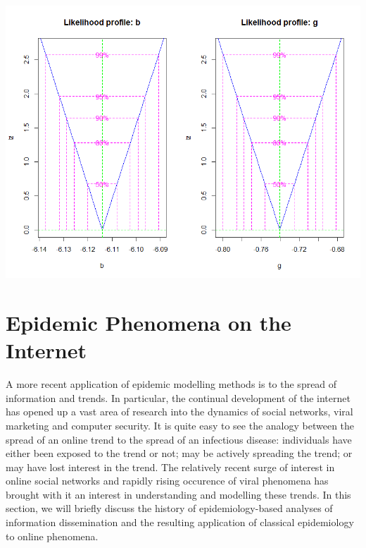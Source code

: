 \begin{framed}
{\begin{center} \includegraphics[width=140mm]{mle.png}\end{center}}

\end{framed}

\section{Epidemic Phenomena on the Internet}
A more recent application of epidemic modelling methods is to the spread of information and trends. In particular, the continual development of the internet has opened up a vast area of research into the dynamics of social networks, viral marketing and computer security. It is quite easy to see the analogy between the spread of an online trend to the spread of an infectious disease: individuals have either been exposed to the trend or not; may be actively spreading the trend; or may have lost interest in the trend. The relatively recent surge of interest in online social networks and rapidly rising occurence of viral phenomena has brought with it an interest in understanding and modelling these trends. In this section, we will briefly discuss the history of epidemiology-based analyses of information dissemination and the resulting application of classical epidemiology to online phenomena.

